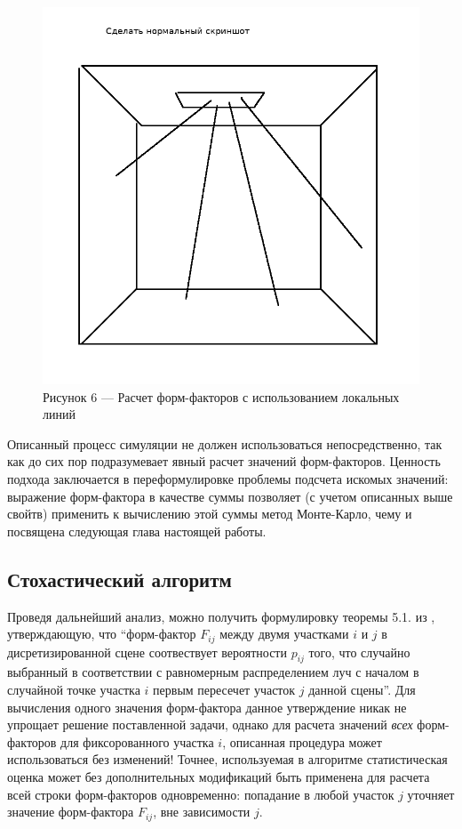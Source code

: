 \documentclass[12pt]{article}
\begin{document}
\begin{figure}[h]
\centering
\includegraphics[scale=0.3]{local_lines.png}
\caption*{Рисунок 6 --- Расчет форм-факторов с использованием локальных линий}
\end{figure}

Описанный процесс симуляции не должен использоваться непосредственно, так как до сих пор подразумевает явный расчет значений форм-факторов. Ценность подхода заключается в переформулировке проблемы подсчета искомых значений: выражение форм-фактора в качестве суммы позволяет (с учетом описанных выше свойтв) применить к вычислению этой суммы метод Монте-Карло, чему и посвящена следующая глава настоящей работы.

\subsection{Стохастический алгоритм}
Проведя дальнейший анализ, можно получить формулировку теоремы 5.1. из \cite{Bek99}, утверждающую, что ``форм-фактор $F_{ij}$ между двумя участками $i$ и $j$ в дисретизированной сцене соотвествует вероятности $p_{ij}$ того, что случайно выбранный в соответствии с равномерным распределением луч с началом в случайной точке участка $i$ первым пересечет участок $j$ данной сцены''. Для вычисления одного значения форм-фактора данное утверждение никак не упрощает решение поставленной задачи, однако для расчета значений \emph{всех} форм-факторов для фиксорованного участка $i$, описанная процедура может использоваться без изменений! Точнее, используемая в алгоритме статистическая оценка может без дополнительных модификаций быть применена для расчета всей строки форм-факторов одновременно: попадание в любой участок $j$ уточняет значение форм-фактора $F_{ij}$, вне зависимости $j$. 
\end{document}
